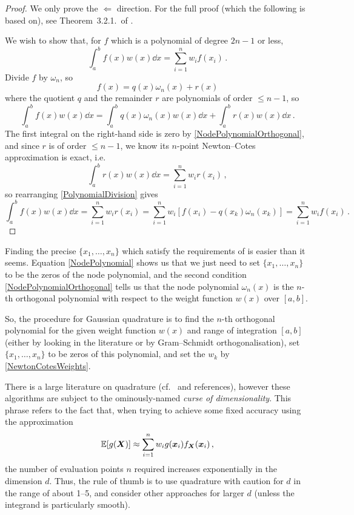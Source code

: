 \begin{proof}
We only prove the $\Leftarrow$ direction. For the full proof (which the following is based on), see Theorem~3.2.1.\ of \cite{gautschi2011numerical}.

We wish to show that, for $f$ which is a polynomial of degree $2n-1$ or less,
\[ \int_a^b f(x) w(x) \dd x = \sum_{i=1}^n w_i f(x_i) \,. \]
Divide $f$ by $\omega_n$, so
\begin{equation} \label{PolynomialDivision}
	f(x) = q(x) \omega_n(x) + r(x)
\end{equation}
where the quotient $q$ and the remainder $r$ are polynomials of order $\le n-1$, so
\[ \int_a^b f(x) w(x) \dd x = \int_a^b q(x) \omega_n(x) w(x) \dd x + \int_a^b r(x) w(x) \dd x \,. \]
The first integral on the right-hand side is zero by \eqref{NodePolynomialOrthogonal}, %
and since $r$ is of order $\le n-1$, we know its $n$-point Newton--Cotes approximation is exact, i.e.
\[ \int_a^b r(x) w(x) \dd x = \sum_{i=1}^n w_i r(x_i) \,, \]
so rearranging \eqref{PolynomialDivision} gives
\[ \int_a^b f(x) w(x) \dd x = \sum_{i=1}^n w_i r(x_i) = \sum_{i=1}^n w_i [f(x_i) - q(x_k) \omega_n(x_k)] = \sum_{i=1}^n w_i f(x_i) \,. \]
\end{proof}

Finding the precise $\{x_1, \dots, x_n\}$ which satisfy the requirements of  is easier than it seems. Equation \eqref{NodePolynomial} shows us that we just need to set $\{x_1, \dots, x_n\}$ to be the zeros of the node polynomial, and the second condition \eqref{NodePolynomialOrthogonal} tells us that the node polynomial $\omega_n(x)$ is the $n$-th orthogonal polynomial with respect to the weight function $w(x)$ over $[a,b]$.

So, the procedure for Gaussian quadrature is to find the $n$-th orthogonal polynomial for the given weight function $w(x)$ and range of integration $[a,b]$ (either by looking in the literature or by Gram--Schmidt orthogonalisation), set $\{x_1, \dots, x_n\}$ to be zeros of this polynomial, and set the $w_k$ by \eqref{NewtonCotesWeights}.

There is a large literature on quadrature (cf.\ \cite{gautschi2011numerical} and references), however these algorithms are subject to the ominously-named \emph{curse of dimensionality}. This phrase refers to the fact that, when trying to achieve some fixed accuracy using the approximation %
\begin{equation*} \label{basic_num_int}
\operatorname{{\mathbb E}}[g(\bm{X})] \approx \sum_{i=1}^n w_i g( \bm{x}_i ) f_{\bm{X}}( \bm{x}_i ) \,,
\end{equation*}
the number of evaluation points $n$ required increases exponentially in the dimension $d$. Thus, the rule of thumb is to use quadrature with caution for $d$ in the range of about 1--5, and consider other approaches for larger $d$ (unless the integrand is particularly smooth).


